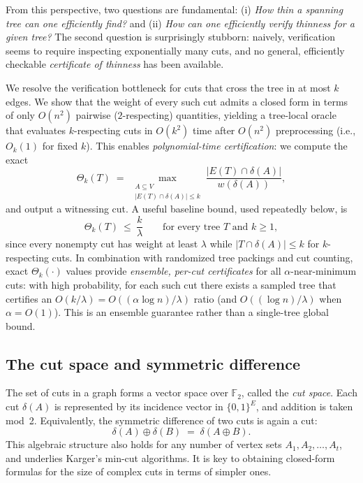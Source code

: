 \documentclass[11pt,letterpaper]{article}
\renewcommand{\paragraph}[1]{\medskip\noindent{\bf #1}\xspace}
\begin{document}
From this perspective, two questions are fundamental:
(i) \emph{How thin a spanning tree can one efficiently find?} and
(ii) \emph{How can one efficiently \emph{verify} thinness for a given tree?}
The second question is surprisingly stubborn: naively, verification seems to
require inspecting exponentially many cuts, and no general, efficiently
checkable \emph{certificate of thinness} has been available.

\paragraph{Our angle.}
We resolve the verification bottleneck for cuts that cross the tree in at most
$k$ edges. We show that the weight of every such cut admits a closed form in
terms of only $O(n^2)$ pairwise ($2$-respecting) quantities, yielding a
tree-local oracle that evaluates $k$-respecting cuts in $O(k^2)$ time after
$O(n^2)$ preprocessing (i.e., $O_k(1)$ for fixed $k$). This enables \emph{polynomial-time certification}:
we compute the exact
\[
\Theta_k(T)\;=\;\max_{\substack{A\subseteq V\\ |E(T)\cap\delta(A)|\le k}}
\frac{|E(T)\cap\delta(A)|}{w(\delta(A))},
\]
and output a witnessing cut.
A useful baseline bound, used repeatedly below, is
\begin{equation}\label{eq:trivial-k-over-lambda}
\Theta_k(T)\ \le\ \frac{k}{\lambda}\qquad\text{for every tree $T$ and $k\ge 1$},
\end{equation}
since every nonempty cut has weight at least $\lambda$ while $|T\cap\delta(A)|\le k$
for $k$-respecting cuts.
In combination with randomized tree packings and cut counting, exact
$\Theta_k(\cdot)$ values provide \emph{ensemble, per-cut certificates} for all $\alpha$-near-minimum
cuts: with high probability, for each such cut there exists a sampled tree that certifies an
$O(k/\lambda)=O((\alpha\log n)/\lambda)$ ratio (and $O((\log n)/\lambda)$ when $\alpha=O(1)$).
This is an ensemble guarantee rather than a single-tree global bound.

\subsection{The cut space and symmetric difference}
\label{sec:cutspace}

The set of cuts in a graph forms a vector space over $\mathbb{F}_2$,
called the \emph{cut space}. Each cut $\delta(A)$ is represented by
its incidence vector in $\{0,1\}^E$, and addition is taken mod~2.
Equivalently, the symmetric difference of two cuts is again a cut:
\[
\delta(A)\oplus\delta(B) \;=\; \delta(A\oplus B).
\]
This algebraic structure also holds for any number of vertex sets $A_1,A_2,\ldots,A_t$,
and underlies Karger’s min-cut algorithms.
It is key to obtaining closed-form formulas for the size of
complex cuts in terms of simpler ones.
\end{document}

